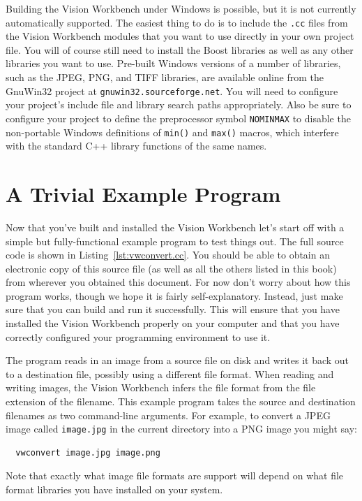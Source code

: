 Building the Vision Workbench under Windows is possible, but it is not
currently automatically supported.  The easiest thing to do is to
include the \verb#.cc# files from the Vision Workbench modules that
you want to use directly in your own project file.  You will of course
still need to install the Boost libraries as well as any other
libraries you want to use.  Pre-built Windows versions of a number of
libraries, such as the JPEG, PNG, and TIFF libraries, are available
online from the GnuWin32 project at \verb#gnuwin32.sourceforge.net#.
You will need to configure your project's include file and library
search paths appropriately.  Also be sure to configure your project to
define the preprocessor symbol \verb#NOMINMAX# to disable the
non-portable Windows definitions of \verb#min()# and \verb#max()#
macros, which interfere with the standard C++ library functions of the
same names.

\section{A Trivial Example Program}

Now that you've built and installed the Vision Workbench let's start
off with a simple but fully-functional example program to test things
out.  The full source code is shown in Listing~\ref{lst:vwconvert.cc}.
You should be able to obtain an electronic copy of this source file
(as well as all the others listed in this book) from wherever you
obtained this document.  For now don't worry about how this program
works, though we hope it is fairly self-explanatory.  Instead, just
make sure that you can build and run it successfully.  This will
ensure that you have installed the Vision Workbench properly on your
computer and that you have correctly configured your programming
environment to use it.


The program reads in an image from a source file on disk and writes it
back out to a destination file, possibly using a different file
format.  When reading and writing images, the Vision Workbench infers
the file format from the file extension of the filename.  This example
program takes the source and destination filenames as two command-line
arguments.  For example, to convert a JPEG image called
\verb#image.jpg# in the current directory into a PNG image you might
say:
\begin{verbatim}
  vwconvert image.jpg image.png
\end{verbatim}
Note that exactly what image file formats are support will depend on
what file format libraries you have installed on your system.

